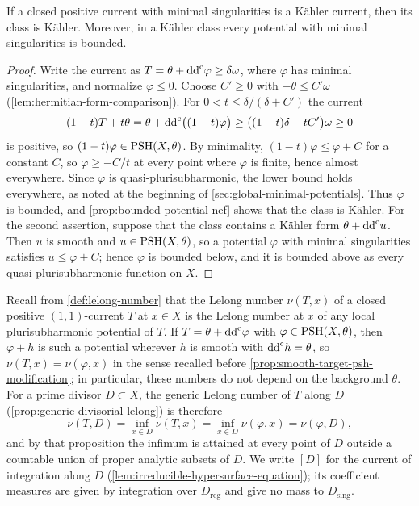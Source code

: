 \begin{corollary}\label{cor:strict-minimal-current-kahler}
If a closed positive current with minimal singularities is a K\"ahler current, then its class is K\"ahler. Moreover, in a K\"ahler class every potential with minimal singularities is bounded.
\end{corollary}
\begin{proof}
Write the current as $T=\theta+\mathrm{dd}^{\mathrm{c}}\varphi\geq\delta\omega$, where $\varphi$ has minimal singularities, and normalize $\varphi\leq0$. Choose $C'\geq0$ with $-\theta\leq C'\omega$ (\cref{lem:hermitian-form-comparison}). For $0<t\leq\delta/(\delta+C')$ the current
\[
 (1-t)T+t\theta=\theta+\mathrm{dd}^{\mathrm{c}}\bigl((1-t)\varphi\bigr)\geq\bigl((1-t)\delta-tC'\bigr)\omega\geq0
\]
is positive, so $(1-t)\varphi\in\mathrm{PSH}(X,\theta)$. By minimality, $(1-t)\varphi\leq\varphi+C$ for a constant $C$, so $\varphi\geq-C/t$ at every point where $\varphi$ is finite, hence almost everywhere. Since $\varphi$ is quasi-plurisubharmonic, the lower bound holds everywhere, as noted at the beginning of \cref{sec:global-minimal-potentials}. Thus $\varphi$ is bounded, and \cref{prop:bounded-potential-nef} shows that the class is K\"ahler. For the second assertion, suppose that the class contains a K\"ahler form $\theta+\mathrm{dd}^{\mathrm{c}} u$. Then $u$ is smooth and $u\in\mathrm{PSH}(X,\theta)$, so a potential $\varphi$ with minimal singularities satisfies $u\leq\varphi+C$; hence $\varphi$ is bounded below, and it is bounded above as every quasi-plurisubharmonic function on $X$.
\end{proof}

Recall from \cref{def:lelong-number} that the Lelong number $\nu(T,x)$ of a closed positive $(1,1)$-current $T$ at $x\in X$ is the Lelong number at $x$ of any local plurisubharmonic potential of $T$. If $T=\theta+\mathrm{dd}^{\mathrm{c}}\varphi$ with $\varphi\in\mathrm{PSH}(X,\theta)$, then $\varphi+h$ is such a potential wherever $h$ is smooth with $\mathrm{dd}^{\mathrm{c}} h=\theta$, so $\nu(T,x)=\nu(\varphi,x)$ in the sense recalled before \cref{prop:smooth-target-psh-modification}; in particular, these numbers do not depend on the background $\theta$. For a prime divisor $D\subset X$, the generic Lelong number of $T$ along $D$ (\cref{prop:generic-divisorial-lelong}) is therefore
\[
 \nu(T,D)=\inf_{x\in D}\nu(T,x)=\inf_{x\in D}\nu(\varphi,x)=\nu(\varphi,D),
\]
and by that proposition the infimum is attained at every point of $D$ outside a countable union of proper analytic subsets of $D$. We write $[D]$ for the current of integration along $D$ (\cref{lem:irreducible-hypersurface-equation}); its coefficient measures are given by integration over $D_{\mathrm{reg}}$ and give no mass to $D_{\mathrm{sing}}$.

